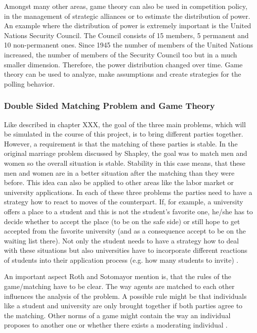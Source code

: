 Amongst many other areas, game theory can also be used in competition policy, in the management of strategic alliances or to estimate the distribution of power. 
An example where the distribution of power is extremely important is the United Nations Security Council. 
The Council consists of 15 members, 5 permanent and 10 non-permanent ones. 
Since 1945 the number of members of the United Nations increased, the number of members of the Security Council too but in a much smaller dimension. 
Therefore, the power distribution changed over time.
Game theory can be used to analyze, make assumptions and create strategies for the polling behavior. \cite{schankanwendungen}



\subsubsection{Double Sided Matching Problem and Game Theory}

Like described in chapter XXX, the goal of the three main problems, which will be simulated in the course of this project, is to bring different parties together.
However, a requirement is that the matching of these parties is stable.
In the original marriage problem discussed by Shapley, the goal was to match men and women so the overall situation is stable.
Stability in this case means, that these men and women are in a better situation after the matching than they were before. 
This idea can also be applied to other areas like the labor market or university applications.
In each of these three problems the parties need to have a strategy how to react to moves of the counterpart.
If, for example, a university offers a place to a student and this is not the student's favorite one, he/she has to decide whether to accept the place (to be on the safe side) or still hope to get accepted from the favorite university (and as a consequence accept to be on the waiting list there).
Not only the student needs to have a strategy how to deal with these situations but also universities have to incorporate different reactions of students into their application process (e.g. how many students to invite) \cite{gale62a}.

An important aspect Roth and Sotomayor mention is, that the rules of the game/matching have to be clear.
The way agents are matched to each other influences the analysis of the problem.
A possible rule might be that individuals like a student and university are only brought together if both parties agree to the matching.
Other norms of a game might contain the way an individual proposes to another one or whether there exists a moderating individual \cite[p. 492]{roth1992two}.